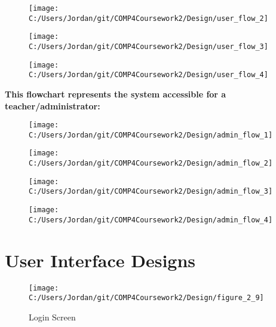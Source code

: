 \begin{figure}[H]
    \texttt{[image: C:/Users/Jordan/git/COMP4Coursework2/Design/user\_flow\_2]}
    \label{fig:print_function_result}\caption{}
\end{figure}

\begin{figure}[H]
    \texttt{[image: C:/Users/Jordan/git/COMP4Coursework2/Design/user\_flow\_3]}
    \label{fig:print_function_result}\caption{}
\end{figure}

\begin{figure}[H]
    \texttt{[image: C:/Users/Jordan/git/COMP4Coursework2/Design/user\_flow\_4]}
    \label{fig:print_function_result}\caption{}
\end{figure}

\textbf{This flowchart represents the system accessible for a teacher/administrator: }

\begin{figure}[H]
    \texttt{[image: C:/Users/Jordan/git/COMP4Coursework2/Design/admin\_flow\_1]}
    \label{fig:print_function_result}\caption{}
\end{figure}

\begin{figure}[H]
    \texttt{[image: C:/Users/Jordan/git/COMP4Coursework2/Design/admin\_flow\_2]}
    \label{fig:print_function_result}\caption{}
\end{figure}

\begin{figure}[H]
    \texttt{[image: C:/Users/Jordan/git/COMP4Coursework2/Design/admin\_flow\_3]}
    \label{fig:print_function_result}\caption{}
\end{figure}

\begin{figure}[H]
    \texttt{[image: C:/Users/Jordan/git/COMP4Coursework2/Design/admin\_flow\_4]}
    \label{fig:print_function_result}\caption{}
\end{figure}

\section{User Interface Designs}


\begin{figure}[H]
    \label{fig:print_function_result}\caption{Login Screen}
    \texttt{[image: C:/Users/Jordan/git/COMP4Coursework2/Design/figure\_2\_9]}
\end{figure}

